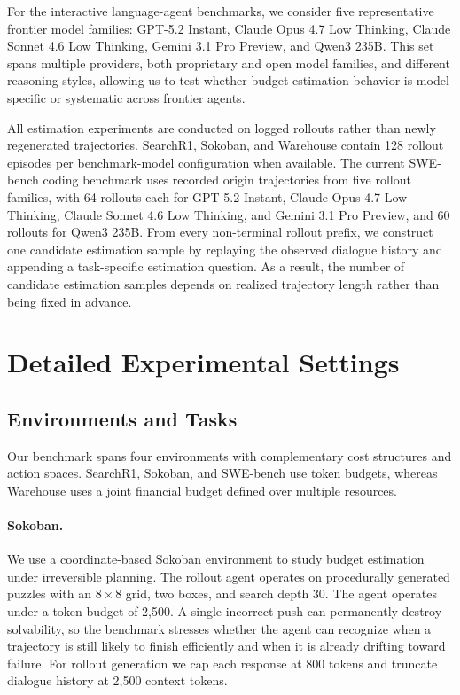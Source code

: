 For the interactive language-agent benchmarks, we consider five representative frontier model families: GPT-5.2 Instant, Claude Opus 4.7 Low Thinking, Claude Sonnet 4.6 Low Thinking, Gemini 3.1 Pro Preview, and Qwen3 235B. This set spans multiple providers, both proprietary and open model families, and different reasoning styles, allowing us to test whether budget estimation behavior is model-specific or systematic across frontier agents.

All estimation experiments are conducted on logged rollouts rather than newly regenerated trajectories. SearchR1, Sokoban, and Warehouse contain 128 rollout episodes per benchmark-model configuration when available. The current SWE-bench coding benchmark uses recorded origin trajectories from five rollout families, with 64 rollouts each for GPT-5.2 Instant, Claude Opus 4.7 Low Thinking, Claude Sonnet 4.6 Low Thinking, and Gemini 3.1 Pro Preview, and 60 rollouts for Qwen3 235B. From every non-terminal rollout prefix, we construct one candidate estimation sample by replaying the observed dialogue history and appending a task-specific estimation question. As a result, the number of candidate estimation samples depends on realized trajectory length rather than being fixed in advance.

\section{Detailed Experimental Settings}
\label{sec:detailed-experimental-settings}

\subsection{Environments and Tasks}
\label{sec:environments-and-tasks}

Our benchmark spans four environments with complementary cost structures and action spaces. SearchR1, Sokoban, and SWE-bench use token budgets, whereas Warehouse uses a joint financial budget defined over multiple resources.

\paragraph{Sokoban.}
We use a coordinate-based Sokoban environment to study budget estimation under irreversible planning. The rollout agent operates on procedurally generated puzzles with an $8 \times 8$ grid, two boxes, and search depth 30. The agent operates under a token budget of 2{,}500. A single incorrect push can permanently destroy solvability, so the benchmark stresses whether the agent can recognize when a trajectory is still likely to finish efficiently and when it is already drifting toward failure. For rollout generation we cap each response at 800 tokens and truncate dialogue history at 2{,}500 context tokens.

